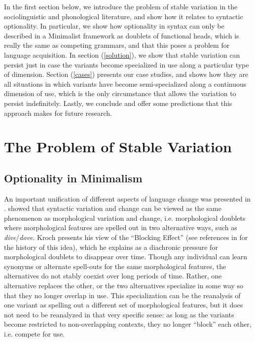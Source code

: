 In the first section below, we introduce the problem of stable variation in the sociolinguistic and phonological literature, and show how it relates to syntactic optionality. In particular, we show how optionality in syntax can only be described in a Minimalist framework as doublets of functional heads, which is really the same as competing grammars, and that this poses a problem for language acquisition. In section (\ref{solution}), we show that stable variation can persist just in case the variants become specialized in use along a particular type of dimension. Section (\ref{cases}) presents our case studies, and shows how they are all situations in which variants have become semi-specialized along a continuous dimension of use, which is the only circumstance that allows the variation to persist indefinitely. Lastly, we conclude and offer some predictions that this approach makes for future research.


\section{The Problem of Stable Variation}
\subsection{Optionality in Minimalism}

An important unification of different aspects of language change was presented in \citet{kroch1994}. \citet{kroch1994} showed that syntactic variation and change can be viewed as the same phenomenon as morphological variation and change, i.e. morphological doublets where morphological features are spelled out in two alternative ways, such as \textsl{dive}/\textsl{dove}. Kroch presents his view of the ``Blocking Effect'' (see references in \citealt{kroch1994} for the history of this idea), which he explains as a diachronic pressure for morphological doublets to disappear over time. Though any individual can learn synonyms or alternate spell-outs for the same morphological features, the alternatives do not stably coexist over long periods of time. Rather, one alternative replaces the other, or the two alternatives specialize in some way so that they no longer overlap in use. This specialization can be the reanalysis of one variant as spelling out a different set of morphological features, but it does not need to be reanalyzed in that very specific sense: as long as the variants become restricted to non-overlapping contexts, they no longer ``block'' each other, i.e. compete for use.

